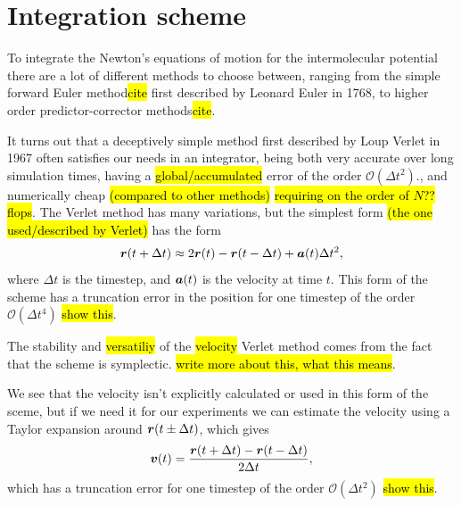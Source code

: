 \section{Integration scheme}
To integrate the Newton's equations of motion for the intermolecular potential there are a lot of different methods to choose between, ranging from the simple forward Euler method\hl{cite} first described by Leonard Euler in 1768, to higher order predictor-corrector methods\hl{cite}. 

It turns out that a deceptively simple method first described by Loup Verlet in 1967\cite{verlet1967computer} often satisfies our needs in an integrator, being both very accurate over long simulation times, having a \hl{global/accumulated} error of the order $\mathcal{O}(\Delta t^2)$., and numerically cheap \hl{(compared to other methods)} \hl{requiring on the order of $N$?? flops}. The Verlet method has many variations, but the simplest form \hl{(the one used/described by Verlet)} has the form
\begin{align}
    \boldsymbol{r}(t + \Delta t) \approx 2\boldsymbol{r}(t) - \boldsymbol{r}(t - \Delta t) + \boldsymbol{a}(t)\Delta t^2,
    \label{eq:regular_verlet}
\end{align}
where $\Delta t$ is the timestep, and $\boldsymbol{a}(t)$ is the velocity at time $t$. This form of the scheme has a truncation error in the position for one timestep of the order $\mathcal{O}(\Delta t^4)$ \hl{show this}.

The stability and \hl{versatiliy} of the \hl{velocity} Verlet method comes from the fact that the scheme is symplectic. \hl{write more about this, what this means}.

We see that the velocity isn't explicitly calculated or used in this form of the sceme, but if we need it for our experiments we can estimate the velocity using a Taylor expansion around $\boldsymbol{r}(t\pm\Delta t)$, which gives
\begin{align*}
    \boldsymbol{v}(t) = \frac{\boldsymbol{r}(t + \Delta t) - \boldsymbol{r}(t - \Delta t)}{2\Delta t},
\end{align*}
which has a truncation error for one timestep of the order $\mathcal{O}(\Delta t^2)$ \hl{show this}. 

